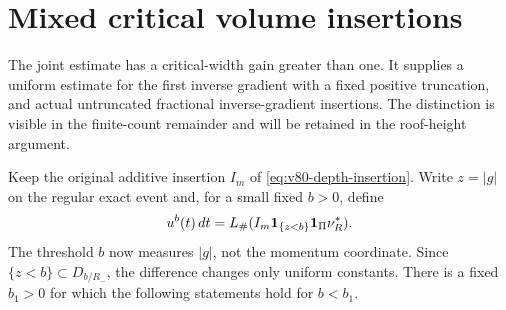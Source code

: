 \section{Mixed critical volume insertions}
\label{sec:v81-mixed}
The joint estimate has a critical-width gain greater than one.
It supplies a uniform estimate for the first inverse gradient with
a fixed positive truncation, and actual untruncated fractional
inverse-gradient insertions. The distinction is visible in the
finite-count remainder and will be retained in the roof-height argument.

Keep the original additive insertion $I_m$ of
\eqref{eq:v80-depth-insertion}. Write $z=|g|$ on the regular exact
event and, for a small fixed $b>0$, define
\begin{equation}\label{eq:v81-critical-volume}
 u^b(t)\,dt=L_\#(I_m\one_{\{z<b\}}\one_\Pi\nu_R^*).
\end{equation}
The threshold $b$ now measures $|g|$, not the momentum coordinate.
Since $\{z<b\}\subset D_{b/R_-}$, the difference changes only
uniform constants. There is a fixed $b_1>0$ for which the following
statements hold for $b<b_1$.


